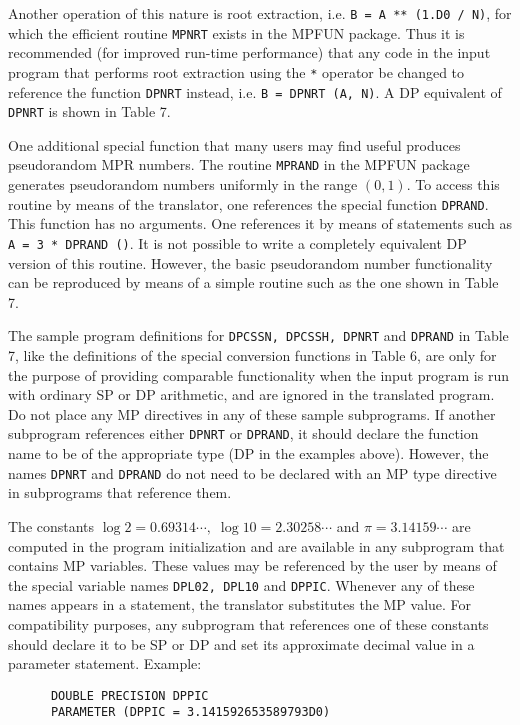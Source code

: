 Another operation of this nature is root extraction, i.e.  {\tt B = A
** (1.D0 / N)}, for which the efficient routine {\tt MPNRT} exists in
the MPFUN package.  Thus it is recommended (for improved run-time
performance) that any code in the input program that performs root
extraction using the {\tt **} operator be changed to reference the
function {\tt DPNRT} instead, i.e. {\tt B = DPNRT (A, N)}.  A DP
equivalent of {\tt DPNRT} is shown in Table 7.
 
One additional special function that many users may find useful
produces pseudorandom MPR numbers.  The routine {\tt MPRAND} in the
MPFUN package generates pseudorandom numbers uniformly in the range
$(0, 1)$.  To access this routine by means of the translator, one
references the special function {\tt DPRAND}.  This function has no
arguments.  One references it by means of statements such as {\tt A =
3 * DPRAND ()}.  It is not possible to write a completely equivalent
DP version of this routine.  However, the basic pseudorandom number
functionality can be reproduced by means of a simple routine such as
the one shown in Table 7.

The sample program definitions for {\tt DPCSSN, DPCSSH, DPNRT} and
{\tt DPRAND} in Table 7, like the definitions of the special
conversion functions in Table 6, are only for the purpose of providing
comparable functionality when the input program is run with ordinary
SP or DP arithmetic, and are ignored in the translated program.  Do
not place any MP directives in any of these sample subprograms.  If
another subprogram references either {\tt DPNRT} or {\tt DPRAND}, it
should declare the function name to be of the appropriate type (DP in
the examples above).  However, the names {\tt DPNRT} and {\tt DPRAND}
do not need to be declared with an MP type directive in subprograms
that reference them.

The constants $\log 2 = 0.69314\cdots, \; \log 10 = 2.30258\cdots$ and
$\pi = 3.14159\cdots$ are computed in the program initialization and
are available in any subprogram that contains MP variables.  These
values may be referenced by the user by means of the special variable
names {\tt DPL02, DPL10} and {\tt DPPIC}.  Whenever any of these names
appears in a statement, the translator substitutes the MP value.  For
compatibility purposes, any subprogram that references one of these
constants should declare it to be SP or DP and set its approximate
decimal value in a parameter statement.  Example:
 
\begin{tt} \begin{small} \begin{verbatim}
      DOUBLE PRECISION DPPIC
      PARAMETER (DPPIC = 3.141592653589793D0)
\end{verbatim} \end{small} \end{tt}
 
